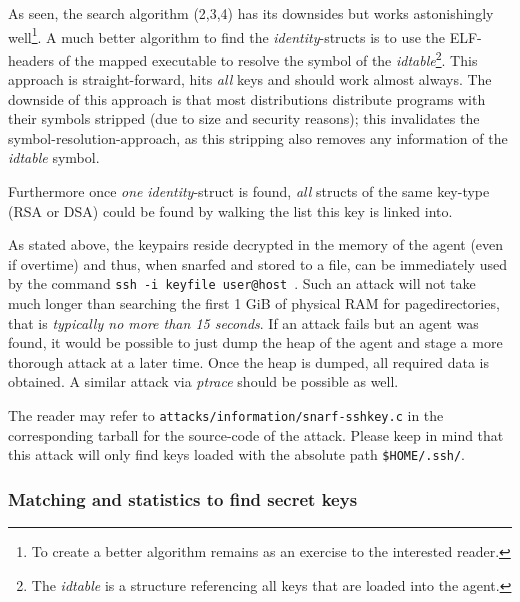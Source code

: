 As seen, the search algorithm (2,3,4) has its downsides but works astonishingly
well\footnote{To create a better algorithm remains as an exercise to the
interested reader.}. A much better algorithm to find the \emph{identity}-structs
is to use the ELF-headers of the mapped executable to resolve the symbol of the
\emph{idtable}\footnote{The \emph{idtable} is a structure referencing all keys
that are loaded into the agent.}. This approach is straight-forward, hits
\emph{all} keys and should work almost always. The downside of this approach is
that most distributions distribute programs with their symbols stripped (due to
size and security reasons); this invalidates the symbol-resolution-approach, as
this stripping also removes any information of the \emph{idtable} symbol.

Furthermore once \emph{one} \emph{identity}-struct is found, \emph{all} structs
of the same key-type (RSA or DSA) could be found by walking the list this key is
linked into.

As stated above, the keypairs reside decrypted in the memory of the agent (even
if overtime) and thus, when snarfed and stored to a file, can be immediately
used by the command \texttt{ssh~-i~keyfile~user@host}~.  Such an attack will not
take much longer than searching the first 1 GiB of physical RAM for
pagedirectories, that is \emph{typically no more than 15 seconds}. If an attack
fails but an agent was found, it would be possible to just dump the heap of the
agent and stage a more thorough attack at a later time. Once the heap is dumped,
all required data is obtained. A similar attack via \emph{ptrace} should be
possible as well.

The reader may refer to \texttt{attacks/information/snarf-sshkey.c} in the
corresponding tarball for the source-code of the attack. Please keep in mind
that this attack will only find keys loaded with the absolute path
\texttt{\$HOME/.ssh/}.


\subsubsection{Matching and statistics to find secret keys}

